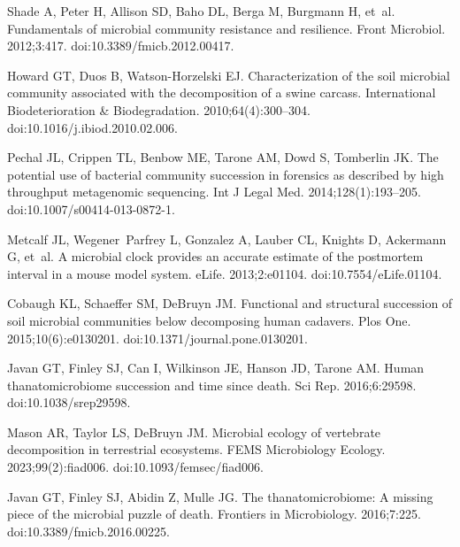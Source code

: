 \documentclass[
  10pt,
  letterpaper,
]{article}
\begin{document}
\nolinenumbers
  \begin{thebibliography}{10}

  Shade A, Peter H, Allison SD, Baho DL, Berga M, Burgmann H, et~al.
  \newblock Fundamentals of microbial community resistance and resilience.
  \newblock Front Microbiol. 2012;3:417.
  \newblock doi:{10.3389/fmicb.2012.00417}.
  
  Howard GT, Duos B, Watson-Horzelski EJ.
  \newblock Characterization of the soil microbial community associated with the
    decomposition of a swine carcass.
  \newblock International Biodeterioration \& Biodegradation.
    2010;64(4):300--304.
  \newblock doi:{10.1016/j.ibiod.2010.02.006}.
  
  Pechal JL, Crippen TL, Benbow ME, Tarone AM, Dowd S, Tomberlin JK.
  \newblock The potential use of bacterial community succession in forensics as
    described by high throughput metagenomic sequencing.
  \newblock Int J Legal Med. 2014;128(1):193--205.
  \newblock doi:{10.1007/s00414-013-0872-1}.
  
  Metcalf JL, Wegener~Parfrey L, Gonzalez A, Lauber CL, Knights D, Ackermann G,
    et~al.
  \newblock A microbial clock provides an accurate estimate of the postmortem
    interval in a mouse model system.
  \newblock eLife. 2013;2:e01104.
  \newblock doi:{10.7554/eLife.01104}.
  
  Cobaugh KL, Schaeffer SM, DeBruyn JM.
  \newblock Functional and structural succession of soil microbial communities
    below decomposing human cadavers.
  \newblock Plos One. 2015;10(6):e0130201.
  \newblock doi:{10.1371/journal.pone.0130201}.
  
  Javan GT, Finley SJ, Can I, Wilkinson JE, Hanson JD, Tarone AM.
  \newblock Human thanatomicrobiome succession and time since death.
  \newblock Sci Rep. 2016;6:29598.
  \newblock doi:{10.1038/srep29598}.
  
  Mason AR, Taylor LS, DeBruyn JM.
  \newblock Microbial ecology of vertebrate decomposition in terrestrial
    ecosystems.
  \newblock FEMS Microbiology Ecology. 2023;99(2):fiad006.
  \newblock doi:{10.1093/femsec/fiad006}.
  
  Javan GT, Finley SJ, Abidin Z, Mulle JG.
  \newblock The thanatomicrobiome: {A} missing piece of the microbial puzzle of
    death.
  \newblock Frontiers in Microbiology. 2016;7:225.
  \newblock doi:{10.3389/fmicb.2016.00225}.
  

\end{thebibliography}
\end{document}
